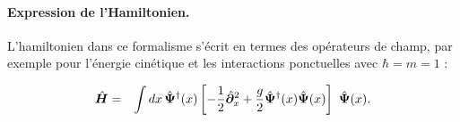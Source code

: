 








\paragraph{Expression de l’Hamiltonien. }
L’hamiltonien dans ce formalisme s’écrit en termes des opérateurs de champ, par exemple pour l’énergie cinétique et les interactions ponctuelles avec $\hbar = m = 1 $  :



\begin{eqnarray}
	\operator{H} & = & \int dx \, \operator{\Psi}^\dag (x)\left [-\frac{1}{2}\operator{\partial}_x^2 + \frac{g}{2}  \operator{\Psi}^\dag (x) \operator{\Psi} (x) \right ] \operator{\Psi} (x) \label{chap:1:ham.mod}.
\end{eqnarray}

